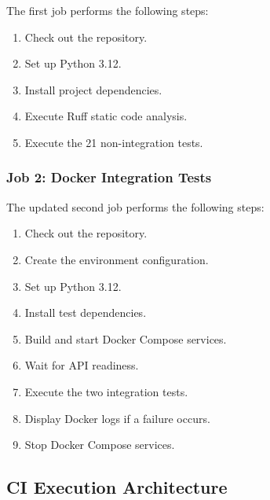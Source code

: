 \documentclass[11pt,a4paper]{article}
\begin{document}
The first job performs the following steps:

\begin{enumerate}
    \item Check out the repository.
    \item Set up Python 3.12.
    \item Install project dependencies.
    \item Execute Ruff static code analysis.
    \item Execute the 21 non-integration tests.
\end{enumerate}

\subsubsection*{Job 2: Docker Integration Tests}

The updated second job performs the following steps:

\begin{enumerate}
    \item Check out the repository.
    \item Create the environment configuration.
    \item Set up Python 3.12.
    \item Install test dependencies.
    \item Build and start Docker Compose services.
    \item Wait for API readiness.
    \item Execute the two integration tests.
    \item Display Docker logs if a failure occurs.
    \item Stop Docker Compose services.
\end{enumerate}

\subsection{CI Execution Architecture}
\end{document}
